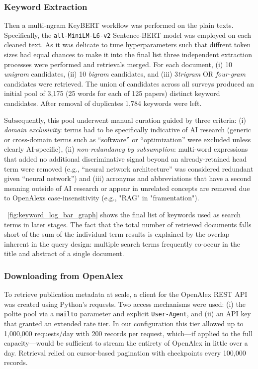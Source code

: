 \documentclass{article}
\begin{document}
\subsubsection{Keyword Extraction}

Then a multi-ngram KeyBERT workflow was performed on the plain texts. Specifically, the \texttt{all-MiniLM-L6-v2} Sentence-BERT model was employed on each cleaned text. As it was delicate to tune hyperparameters such that diffrent token sizes had equal chances to make it into the final list three independent extraction processes were performed and retrievals merged. For each document, (i) 10 \emph{unigram} candidates, (ii) 10 \emph{bigram} candidates, and (iii) 3\emph{trigram} OR \emph{four-gram} candidates were retrieved. The union of candidates across all surveys produced an initial pool of 3{,}175 (25 words for each of 125 papers) distinct keyword candidates. After removal of duplicates 1{,}784 keywords were left.

Subsequently, this pool underwent manual curation guided by three criteria: (i) \emph{domain exclusivity}: terms had to be specifically indicative of AI research (generic or cross-domain terms such as “software” or “optimization” were excluded unless clearly AI-specific), (ii) \emph{non-redundancy by subsumption}: multi-word expressions that added no additional discriminative signal beyond an already-retained head term were removed (e.g., “neural network architecture” was considered redundant given “neural network”) and (iii) acronyms and abbreviations that have a second meaning outside of AI research or appear in unrelated concepts are removed due to OpenAlexs case-insensitivity (e.g., "RAG" in "framentation"). 

\figurename~\ref{fig:keyword_log_bar_graph} shows the final list of keywords used as search terms in later stages. The fact that the total number of retrieved documents falls short of the sum of the individual term results is explained by the overlap inherent in the query design: multiple search terms frequently co-occur in the title and abstract of a single document.

\subsubsection{Downloading from OpenAlex}

To retrieve publication metadata at scale, a client for the OpenAlex REST API was created using Python’s requests. Two access mechanisms were used: (i) the polite pool via a \texttt{mailto} parameter and explicit \texttt{User-Agent}, and (ii) an API key that granted an extended rate tier. In our configuration this tier allowed up to 1{,}000{,}000 requests/day with 200 records per request, which—if applied to the full capacity—would be sufficient to stream the entirety of OpenAlex in little over a day. Retrieval relied on cursor-based pagination with checkpoints every 100,000 records.
\end{document}
